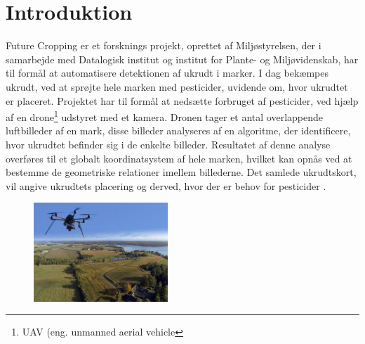 \chapter{Introduktion} \label{sec:intro}
Future Cropping er et forsknings projekt, oprettet af Miljøstyrelsen, der i samarbejde med Datalogisk institut og institut for Plante- og Miljøvidenskab, har til formål at automatisere detektionen af ukrudt i marker. I dag bekæmpes ukrudt, ved at sprøjte hele marken med pesticider, uvidende om, hvor ukrudtet er placeret. Projektet har til formål at nedsætte forbruget af pesticider, ved hjælp af en drone\footnote{UAV (eng. unmanned aerial vehicle} udstyret med et kamera. Dronen tager et antal overlappende luftbilleder af en mark, disse billeder analyseres af en algoritme, der identificere, hvor ukrudtet befinder sig i de enkelte billeder. Resultatet af denne analyse overføres til et globalt koordinatsystem af hele marken, hvilket kan opnås ved at bestemme de geometriske relationer imellem billederne. Det samlede ukrudtskort, vil angive ukrudtets placering og derved, hvor der er behov for pesticider \cite{drone}.
\begin{figure}[H]
    \centering
    \includegraphics[width=0.45\textwidth]{fig/drone4.jpg}
     \vspace{-0.5em}
    \begin{center}    
       \caption{\textcolor{gray}{\footnotesize \textit{ }}}
    \label{fig:difference}
     \end{center}
     \vspace{-3em}
  \end{figure} \noindent
